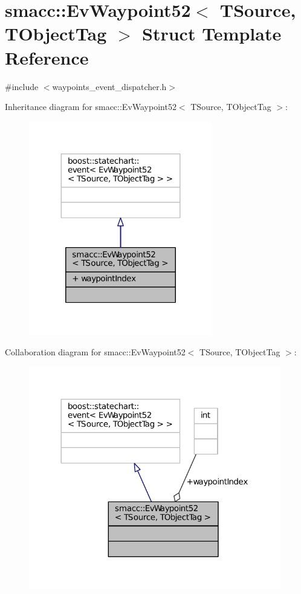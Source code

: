 \hypertarget{structsmacc_1_1EvWaypoint52}{}\section{smacc\+:\+:Ev\+Waypoint52$<$ T\+Source, T\+Object\+Tag $>$ Struct Template Reference}
\label{structsmacc_1_1EvWaypoint52}


{\ttfamily \#include $<$waypoints\+\_\+event\+\_\+dispatcher.\+h$>$}



Inheritance diagram for smacc\+:\+:Ev\+Waypoint52$<$ T\+Source, T\+Object\+Tag $>$\+:
\nopagebreak
\begin{figure}[H]
\begin{center}
\leavevmode
\includegraphics[width=227pt]{structsmacc_1_1EvWaypoint52__inherit__graph}
\end{center}
\end{figure}


Collaboration diagram for smacc\+:\+:Ev\+Waypoint52$<$ T\+Source, T\+Object\+Tag $>$\+:
\nopagebreak
\begin{figure}[H]
\begin{center}
\leavevmode
\includegraphics[width=312pt]{structsmacc_1_1EvWaypoint52__coll__graph}
\end{center}
\end{figure}
